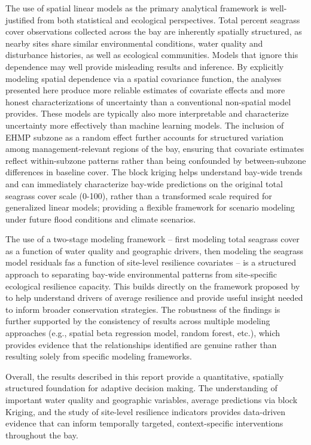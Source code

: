\documentclass[
  letterpaper,
  DIV=11,
  numbers=noendperiod]{scrartcl}
\begin{document}
The use of spatial linear models as the primary analytical framework is
well-justified from both statistical and ecological perspectives. Total
percent seagrass cover observations collected across the bay are
inherently spatially structured, as nearby sites share similar
environmental conditions, water quality and disturbance histories, as
well as ecological communities. Models that ignore this dependence may
well provide misleading results and inference. By explicitly modeling
spatial dependence via a spatial covariance function, the analyses
presented here produce more reliable estimates of covariate effects and
more honest characterizations of uncertainty than a conventional
non-spatial model provides. These models are typically also more
interpretable and characterize uncertainty more effectively than machine
learning models. The inclusion of EHMP subzone as a random effect
further accounts for structured variation among management-relevant
regions of the bay, ensuring that covariate estimates reflect
within-subzone patterns rather than being confounded by between-subzone
differences in baseline cover. The block kriging helps understand
bay-wide trends and can immediately characterize bay-wide predictions on
the original total seagrass cover scale (0-100), rather than a
transformed scale required for generalized linear models; providing a
flexible framework for scenario modeling under future flood conditions
and climate scenarios.

The use of a two-stage modeling framework -- first modeling total
seagrass cover as a function of water quality and geographic drivers,
then modeling the seagrass model residuals fas a function of site-level
resilience covariates -- is a structured approach to separating bay-wide
environmental patterns from site-specific ecological resilience
capacity. This builds directly on the framework proposed by
\citet{gilby2023drivers} to help understand drivers of average
resilience and provide useful insight needed to inform broader
conservation strategies. The robustness of the findings is further
supported by the consistency of results across multiple modeling
approaches (e.g., spatial beta regression model, random forest, etc.),
which provides evidence that the relationships identified are genuine
rather than resulting solely from specific modeling frameworks.

Overall, the results described in this report provide a quantitative,
spatially structured foundation for adaptive decision making. The
understanding of important water quality and geographic variables,
average predictions via block Kriging, and the study of site-level
resilience indicators provides data-driven evidence that can inform
temporally targeted, context-specific interventions throughout the bay.
\end{document}
